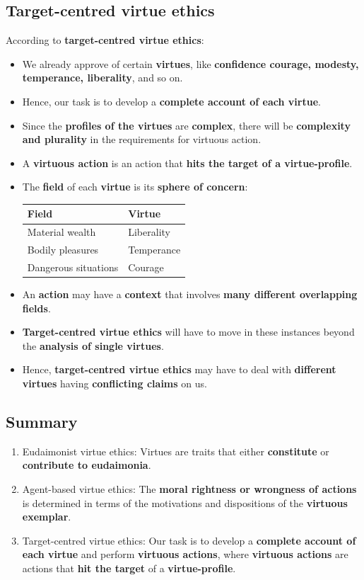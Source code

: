 \documentclass[11pt]{article}
\begin{document}
\subsection{Target-centred virtue ethics}
\label{sec:orgc4d3fe0}
According to \textbf{target-centred virtue ethics}:
\begin{itemize}
\item We already approve of certain \textbf{virtues}, like \textbf{confidence courage, modesty, temperance, liberality}, and so on.
\item Hence, our task is to develop a \textbf{complete account of each virtue}.
\item Since the \textbf{profiles of the virtues} are \textbf{complex}, there will be \textbf{complexity and plurality} in the requirements for virtuous action.
\item A \textbf{virtuous action} is an action that \textbf{hits the target of a virtue-profile}.
\item The \textbf{field} of each \textbf{virtue} is its \textbf{sphere of concern}:
\begin{center}
\begin{tabularx}{\textwidth}{X|X}
Field & Virtue\\
\hline
Material wealth & Liberality\\
Bodily pleasures & Temperance\\
Dangerous situations & Courage\\
\end{tabularx}
\end{center}
\item An \textbf{action} may have a \textbf{context} that involves \textbf{many different overlapping fields}.
\item \textbf{Target-centred virtue ethics} will have to move in these instances beyond the \textbf{analysis of single virtues}.
\item Hence, \textbf{target-centred virtue ethics} may have to deal with \textbf{different virtues} having \textbf{conflicting claims} on us.
\end{itemize}
\subsection{Summary}
\label{sec:org64fd966}
\begin{enumerate}
\item Eudaimonist virtue ethics:
Virtues are traits that either \textbf{constitute} or \textbf{contribute to eudaimonia}.
\item Agent-based virtue ethics:
The \textbf{moral rightness or wrongness of actions} is determined in terms of the motivations and dispositions of the \textbf{virtuous exemplar}.
\item Target-centred virtue ethics:
Our task is to develop a \textbf{complete account of each virtue} and perform \textbf{virtuous actions}, where \textbf{virtuous actions} are actions that \textbf{hit the target} of a \textbf{virtue-profile}.
\end{enumerate}
\end{document}
